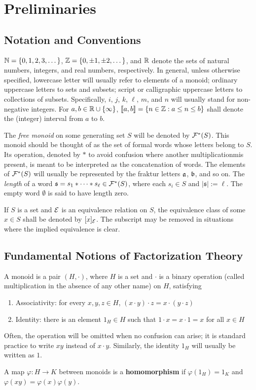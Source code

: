 \section{Preliminaries}
\subsection{Notation and Conventions} \label{subsec:generalities}

$\NN = \{0,1,2,3,\dots\}$, $\ZZ = \{0,\pm 1, \pm 2,\dots\}$, and $\RR$ denote the sets of natural numbers, integers, and real numbers, respectively.
In general, unless otherwise specified, lowercase letter will usually refer to elements of a monoid; ordinary uppercase letters to sets and subsets; script or calligraphic uppercase letters to collections of subsets.
Specifically, $i$, $j$, $k$, $\ell$, $m$, and $n$ will usually stand for non-negative integers.
For $a, b\in \RR\cup\{\infty\}$, $\llb a,b \rrb = \{ n\in \ZZ : a \le n \le b \}$ shall denote the (integer) interval from $a$ to $b$.

The \textit{free monoid} on some generating set $S$ will be denoted by $\F^*(S)$.  
This monoid should be thought of as the set of formal words whose letters belong to $S$.
Its operation, denoted by $*$ to avoid confusion where another multiplicationmis present, is meant to be interpreted as the concatenation of words.
The elements of $\F^*(S)$ will usually be represented by the fraktur letters $\aa$, $\bb$, and so on.  
The \textit{length} of a word $\mathfrak{s}= s_1 * \cdots * s_\ell  \in \F^*(S)$, where each $s_i\in S$ and $| \mathfrak{s} | := \ell$.
The empty word $\emptyset$ is said to have length zero.

If $S$ is a set and $\E$ is an equivalence relation on $S$, the equivalence class of some $x\in S$ shall be denoted by $[x]_\E$.
The subscript may be removed in situations where the implied equivalence is clear.

\subsection{Fundamental Notions of Factorization Theory} \label{subsec:factorizations}
\begin{defn}
A monoid is a pair $(H,\cdot)$, where $H$ is a set and $\cdot $ is a binary operation (called multiplication in the absence of any other name) on $H$, satisfying
\begin{enumerate}
\item Associativity: for every $x,y,z \in H$, $(x\cdot y)\cdot z = x\cdot (y\cdot z)$
\item Identity: there is an element $1_H\in H$ such that $1\cdot x = x\cdot 1 = x$ for all $x\in H$
\end{enumerate}
Often, the operation will be omitted when no confusion can arise; it is standard practice to write $xy$ instead of $x \cdot y$.
Similarly, the identity $1_H$ will usually be written as $1$.

A map $\varphi: H \to K$ between monoids is a \textbf{homomorphism} if $\varphi(1_H) = 1_K$ and $\varphi(xy) = \varphi(x)\varphi(y)$.
\end{defn}



